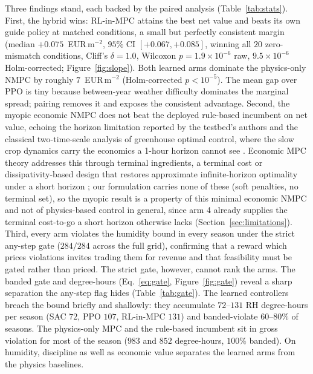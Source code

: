 \documentclass[11pt]{article}
\begin{document}
Three findings stand, each backed by the paired analysis (Table~\ref{tab:stats}).
First, the hybrid wins: RL-in-MPC attains the best net value and beats its own guide
policy at matched conditions, a small but perfectly consistent margin (median
$+0.075$~EUR\,m$^{-2}$, $95\%$ CI $[+0.067, +0.085]$, winning all $20$ zero-mismatch
conditions, Cliff's $\delta = 1.0$, Wilcoxon $p = 1.9\times10^{-6}$ raw, $9.5\times10^{-6}$ Holm-corrected;
Figure~\ref{fig:slope}). Both learned arms dominate the physics-only NMPC by roughly
$7$~EUR\,m$^{-2}$ (Holm-corrected $p < 10^{-5}$). The mean gap over PPO is tiny
because between-year weather difficulty dominates the marginal spread; pairing removes it
and exposes the consistent advantage. Second, the myopic economic NMPC does not beat the deployed rule-based incumbent on net value, echoing the horizon limitation reported by the testbed's authors \citep{vanlaatum2026rlmpc} and the classical two-time-scale analysis of greenhouse optimal control, where the slow crop dynamics carry the economics a 1-hour horizon cannot see \citep{vanhenten2009timescale}. Economic MPC theory addresses this through terminal ingredients, a terminal cost or dissipativity-based design that restores approximate infinite-horizon optimality under a short horizon \citep{angeli2012economicmpc, mayne2014mpcpromise}; our formulation carries none of these (soft penalties, no terminal set), so the myopic result is a property of this minimal economic NMPC and not of physics-based control in general, since arm 4 already supplies the terminal cost-to-go a short horizon otherwise lacks (Section~\ref{sec:limitations}). Third, every arm violates the humidity bound in every season under the strict any-step
gate ($284/284$ across the full grid), confirming that a reward which prices violations invites trading them
for revenue and that feasibility must be gated rather than priced. The strict gate,
however, cannot rank the arms. The banded gate and degree-hours (Eq.~\ref{eq:gate},
Figure~\ref{fig:gate}) reveal a sharp separation the any-step flag hides
(Table~\ref{tab:gate}). The learned controllers breach the bound briefly and shallowly:
they accumulate $72$--$131$ RH degree-hours per season (SAC $72$, PPO $107$, RL-in-MPC $131$) and
banded-violate $60$--$80\%$ of seasons. The physics-only MPC and the
rule-based incumbent sit in gross violation for most of the season ($983$ and $852$
degree-hours, $100\%$ banded). On humidity, discipline as well as economic value separates
the learned arms from the physics baselines.
\end{document}
